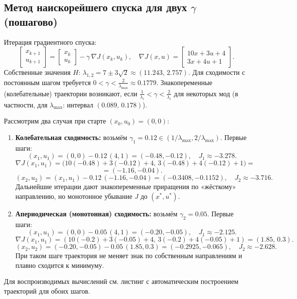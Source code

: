 \subsection{Метод наискорейшего спуска для двух \(\gamma\) (пошагово)}
Итерация градиентного спуска:
\[
\begin{bmatrix}x_{k+1}\\ u_{k+1}\end{bmatrix}=\begin{bmatrix}x_k\\ u_k\end{bmatrix}-\gamma\,\nabla J(x_k,u_k),\quad \nabla J(x,u)=\begin{bmatrix}10x+3u+4\\3x+4u+1\end{bmatrix}.
\]
Собственные значения \(H\): \(\lambda_{1,2}=7\pm3\sqrt{2}\approx(11.243,\,2.757)\). Для сходимости с постоянным шагом требуется \(0<\gamma<\tfrac{2}{\lambda_{\max}}\approx0.1779\). Знакопеременные (колебательные) траектории возникают, если \(\tfrac{1}{\lambda_i}<\gamma<\tfrac{2}{\lambda_i}\) для некоторых мод (в частности, для \(\lambda_{\max}\): интервал \((0.089,\,0.178)\)).

Рассмотрим два случая при старте \((x_0,u_0)=(0,0)\):
\begin{enumerate}
 \item \textbf{Колебательная сходимость:} возьмём \(\gamma_1=0.12\in(1/\lambda_{\max},2/\lambda_{\max})\). Первые шаги:
 \[
 (x_1,u_1)=(0,0)-0.12\,(4,1)=(-0.48,-0.12),\quad J_1\approx-3.278.
 \]
 \[
 \nabla J(x_1,u_1)=\big(10(-0.48)+3(-0.12)+4,\,3(-0.48)+4(-0.12)+1\big) =
 \]
 \[
 = (-1.16,-0.04).
 \]
 \[
 (x_2,u_2)=(x_1,u_1)-0.12\,(-1.16,-0.04)=(-0.3408,-0.1152),\quad
J_2\approx-3.716.
\]
 Дальнейшие итерации дают знакопеременные приращения по «жёсткому» направлению, но монотонное убывание \(J\) до \((x^{\ast},u^{\ast})\).
 \item \textbf{Апериодическая (монотонная) сходимость:} возьмём \(\gamma_2=0.05\). Первые шаги:
 \[
 (x_1,u_1)=(0,0)-0.05\,(4,1)=(-0.20,-0.05),\quad J_1\approx-2.125.
 \]
 \[
 \nabla J(x_1,u_1)=(10(-0.2)+3(-0.05)+4,\,3(-0.2)+4(-0.05)+1)=(1.85,\,0.3).
 \]
 \[
 (x_2,u_2)=(-0.20,-0.05)-0.05\,(1.85,0.3)=(-0.2925,-0.065),\quad
J_2\approx-2.628.
\]
 При таком шаге траектория не меняет знак по собственным направлениям и плавно сходится к минимуму.
\end{enumerate}
Для воспроизводимых вычислений см. листинг с автоматическим построением траекторий для обоих шагов.

